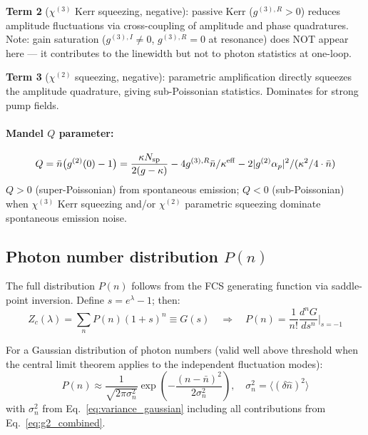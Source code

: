 \documentclass[12pt]{article}
\begin{document}
\textbf{Term 2} ($\chi^{(3)}$ Kerr squeezing, negative): passive Kerr
($g^{(3),R}>0$) reduces amplitude fluctuations via cross-coupling of
amplitude and phase quadratures.  Note: gain saturation ($g^{(3),I}\neq 0$,
$g^{(3),R}=0$ at resonance) does NOT appear here --- it contributes to the
linewidth but not to photon statistics at one-loop.

\textbf{Term 3} ($\chi^{(2)}$ squeezing, negative): parametric amplification
directly squeezes the amplitude quadrature, giving sub-Poissonian statistics.
Dominates for strong pump fields.

\paragraph{Mandel $Q$ parameter:}
\begin{equation}
  Q = \bar{n}\bigl(g^{(2)}(0)-1\bigr) =
  \frac{\kappa N_{\rm sp}}{2(g-\kappa)}
  - 4g^{(3),R}\bar{n}/\kappa^{\rm eff}
  - 2|g^{(2)}\alpha_p|^2/(\kappa^2/4\cdot\bar{n})
  \label{eq:Mandel_Q_combined}
\end{equation}
$Q>0$ (super-Poissonian) from spontaneous emission; $Q<0$ (sub-Poissonian)
when $\chi^{(3)}$ Kerr squeezing and/or $\chi^{(2)}$ parametric squeezing
dominate spontaneous emission noise.

\subsection{Photon number distribution $P(n)$}
\label{sec:Pn}

The full distribution $P(n)$ follows from the FCS generating function
via saddle-point inversion.  Define $s = e^\lambda - 1$; then:
\begin{equation}
  Z_c(\lambda) = \sum_n P(n)(1+s)^n \equiv G(s)
  \quad\Rightarrow\quad
  P(n) = \frac{1}{n!}\frac{d^n G}{ds^n}\bigg|_{s=-1}
  \label{eq:Pn_from_G}
\end{equation}

For a Gaussian distribution of photon numbers (valid well above threshold
when the central limit theorem applies to the independent fluctuation modes):
\begin{equation}
  P(n) \approx \frac{1}{\sqrt{2\pi\sigma_n^2}}
  \exp\!\left(-\frac{(n-\bar{n})^2}{2\sigma_n^2}\right),
  \quad
  \sigma_n^2 = \langle(\delta\hat{n})^2\rangle
  \label{eq:Pn_gaussian}
\end{equation}
with $\sigma_n^2$ from Eq.~\eqref{eq:variance_gaussian} including all
contributions from Eq.~\eqref{eq:g2_combined}.
\end{document}
